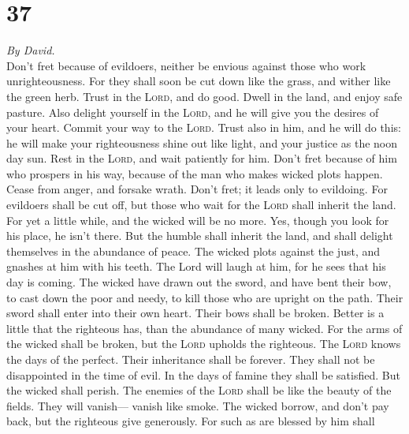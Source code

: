 \hypertarget{section-36}{%
\section{37}\label{section-36}}

\emph{By David.}\\
 Don't fret because of evildoers, neither be envious
against those who work unrighteousness.  For they shall
soon be cut down like the grass, and wither like the green herb.
 Trust in the \textsc{Lord}, and do good. Dwell in the
land, and enjoy safe pasture.  Also delight yourself in
the \textsc{Lord}, and he will give you the desires of your heart.
 Commit your way to the \textsc{Lord}. Trust also in him,
and he will do this:  he will make your righteousness
shine out like light, and your justice as the noon day sun.
 Rest in the \textsc{Lord}, and wait patiently for him.
Don't fret because of him who prospers in his way, because of the man
who makes wicked plots happen.  Cease from anger, and
forsake wrath. Don't fret; it leads only to evildoing. 
For evildoers shall be cut off, but those who wait for the \textsc{Lord}
shall inherit the land.  For yet a little while, and the
wicked will be no more. Yes, though you look for his place, he isn't
there.  But the humble shall inherit the land, and shall
delight themselves in the abundance of peace.  The wicked
plots against the just, and gnashes at him with his teeth.
 The Lord will laugh at him, for he sees that his day is
coming.  The wicked have drawn out the sword, and have
bent their bow, to cast down the poor and needy, to kill those who are
upright on the path.  Their sword shall enter into their
own heart. Their bows shall be broken.  Better is a
little that the righteous has, than the abundance of many wicked.
 For the arms of the wicked shall be broken, but the
\textsc{Lord} upholds the righteous.  The \textsc{Lord}
knows the days of the perfect. Their inheritance shall be forever.
 They shall not be disappointed in the time of evil. In
the days of famine they shall be satisfied.  But the
wicked shall perish. The enemies of the \textsc{Lord} shall be like the
beauty of the fields. They will vanish--- vanish like smoke.
 The wicked borrow, and don't pay back, but the righteous
give generously.  For such as are blessed by him shall

